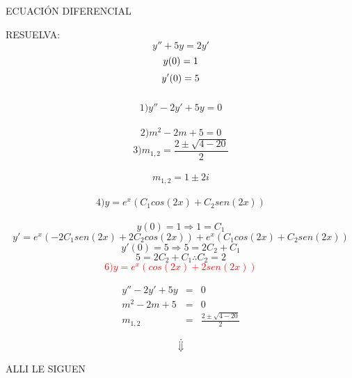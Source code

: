 \documentclass[12pt,a4paper]{book}
\author{José Manuel}
\begin{document}
\begin{center}
ECUACIÓN DIFERENCIAL
\end{center}

RESUELVA: \\

$$y''+5y=2y'$$ $$\\y(0)=1$$ $$\\ y'(0)=5$$\\

$$1) y''-2y'+5y=0$$\\
$$2) m^2-2m+5=0$$
$$3) m_{1,2}=\frac{2\pm\sqrt{4-20}}{2}$$\\
$$m_{1,2}=1\pm2i$$\\
$$4)y=e^x(C_1cos(2x)+C_2sen(2x))$$\\
$$y(0)=1\Rightarrow 1=C_1$$
$$y'=e^x(-2C_1sen(2x)+2C_2cos(2x))+e^x(C_1cos(2x)+C_2sen(2x)) $$
$$y'(0)=5\Rightarrow 5=2C_2+C_1$$
$$5=2C_2+C_1 \therefore C_2=2$$
\textcolor{red}{$$6)y=e^x(cos(2x)+2sen(2x))$$}


\begin{eqnarray}
y''-2y'+5y&=&0\\
m^2-2m+5&=&0\\
m_{1,2}&=&\frac{2\pm\sqrt{4-20}}{2}
\end{eqnarray}

$$\therefore$$
 $$\Downarrow$$
 \begin{center}
 {\Huge ALLI LE SIGUEN}
 \end{center}
\end{document}
